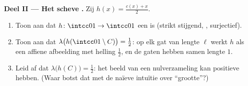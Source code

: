 \begin{problem}
\medskip
\noindent\textbf{Deel II --- Het scheve .} Zij $h(x)
= \frac{c(x) + x}{2}$.
\begin{enumerate}[resume]
  \item Toon aan dat $h \colon \intcc01 \to \intcc01$ een
         is (strikt stijgend, , surjectief).
  \item Toon aan dat $\lambda\bigl(h(\intcc01\setminus C)\bigr) =
        \tfrac12$: op elk gat van lengte $\ell$ werkt $h$ als een
        affiene afbeelding met helling $\tfrac12$, en de gaten
        hebben samen lengte $1$.
  \item Leid af dat $\lambda\bigl(h(C)\bigr) = \tfrac12$: het
         beeld van een nulverzameling kan positieve 
        hebben. (Waar botst dat met de naïeve intuïtie over
        ``grootte''?)
\end{enumerate}


\end{problem}
